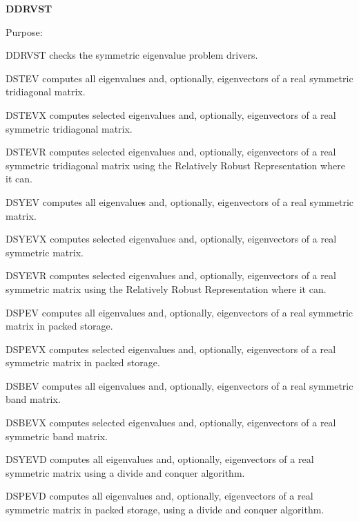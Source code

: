 {\bfseries D\+D\+R\+V\+S\+T} 

\begin{DoxyParagraph}{Purpose\+: }
\begin{DoxyVerb}      DDRVST  checks the symmetric eigenvalue problem drivers.

              DSTEV computes all eigenvalues and, optionally,
              eigenvectors of a real symmetric tridiagonal matrix.

              DSTEVX computes selected eigenvalues and, optionally,
              eigenvectors of a real symmetric tridiagonal matrix.

              DSTEVR computes selected eigenvalues and, optionally,
              eigenvectors of a real symmetric tridiagonal matrix
              using the Relatively Robust Representation where it can.

              DSYEV computes all eigenvalues and, optionally,
              eigenvectors of a real symmetric matrix.

              DSYEVX computes selected eigenvalues and, optionally,
              eigenvectors of a real symmetric matrix.

              DSYEVR computes selected eigenvalues and, optionally,
              eigenvectors of a real symmetric matrix
              using the Relatively Robust Representation where it can.

              DSPEV computes all eigenvalues and, optionally,
              eigenvectors of a real symmetric matrix in packed
              storage.

              DSPEVX computes selected eigenvalues and, optionally,
              eigenvectors of a real symmetric matrix in packed
              storage.

              DSBEV computes all eigenvalues and, optionally,
              eigenvectors of a real symmetric band matrix.

              DSBEVX computes selected eigenvalues and, optionally,
              eigenvectors of a real symmetric band matrix.

              DSYEVD computes all eigenvalues and, optionally,
              eigenvectors of a real symmetric matrix using
              a divide and conquer algorithm.

              DSPEVD computes all eigenvalues and, optionally,
              eigenvectors of a real symmetric matrix in packed
              storage, using a divide and conquer algorithm.


\end{DoxyVerb}
\end{DoxyParagraph}

